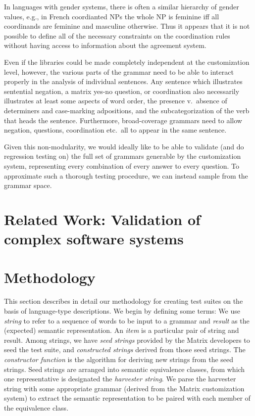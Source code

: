 \documentclass[11pt]{article}
\begin{document}
%
In languages with gender systems, there is often a similar hierarchy
of gender values, e.g., in French coordianted NPs the whole NP is feminine
iff all coordinands are feminine and masculine otherwise.  Thus
it appears that it is not possible to define all of the necessary
constraints on the coordination rules without having access to information
about the agreement system.  

Even if the libraries could be made completely independent at the
customization level, however, the various parts of the grammar need to
be able to interact properly in the analysis of individual sentences.
Any sentence which illustrates sentential negation, a matrix yes-no
question, or coordination also necessarily illustrates at least some
aspects of word order, the presence v.\ absence of determiners and
case-marking adpositions, and the subcategorization of the verb that
heads the sentence.  Furthermore, broad-coverage grammars need to
allow negation, questions, coordination etc.\ all to appear in the
same sentence.

Given this non-modularity, we would ideally like to be able to
validate (and do regression testing on) the full set of grammars
generable by the customization system, representing every combination
of every answer to every question.  To approximate such a thorough
testing procedure, we can instead sample from the grammar space.

\section{Related Work: Validation of complex software systems}
\label{rw}

\section{Methodology}
\label{arch}

This section describes in detail our methodology for creating
test suites on the basis of language-type descriptions.  We begin
by defining some terms:  We use {\it string} to refer to a sequence
of words to be input to a grammar and {\it result} as the (expected)
semantic representation.  An {\it item} is a particular pair of
string and result.  Among strings, we have {\it seed strings} provided
by the Matrix developers to seed the test suite, and {\it constructed
strings} derived from those seed strings.  The {\it constructor function} 
is the algorithm for deriving new strings from the seed strings. Seed
strings are arranged into semantic equivalence classes, from which one
representative is designated the {\it harvester string}.  We parse
the harvester string with some appropriate grammar (derived from
the Matrix customization system) to extract the semantic representation
to be paired with each member of the equivalence class.
\end{document}

